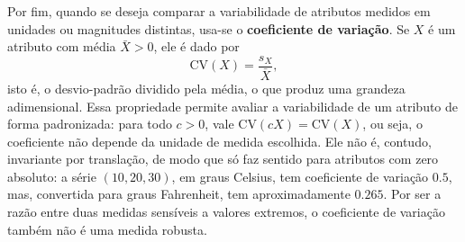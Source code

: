 Por fim, quando se deseja comparar a variabilidade de atributos medidos em unidades ou
magnitudes distintas, usa-se o \textbf{coeficiente de variação}.
Se $X$ é um atributo com média $\bar X > 0$, ele é dado por
\[
	\mathrm{CV}(X) = \frac{s_X}{\bar X},
\]
isto é, o desvio-padrão dividido pela média, o que produz uma grandeza adimensional.
Essa propriedade permite avaliar a variabilidade de um atributo de forma padronizada: para
todo $c > 0$, vale $\mathrm{CV}(cX) = \mathrm{CV}(X)$, ou seja, o coeficiente não depende
da unidade de medida escolhida.
Ele não é, contudo, invariante por translação, de modo que só faz sentido para atributos
com zero absoluto: a série $(10, 20, 30)$, em graus Celsius, tem coeficiente de variação
$0.5$, mas, convertida para graus Fahrenheit, tem aproximadamente $0.265$.
Por ser a razão entre duas medidas sensíveis a valores extremos, o coeficiente de variação
também não é uma medida robusta.
